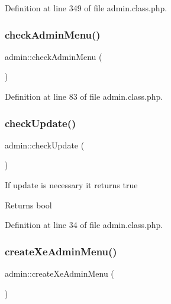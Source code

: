 Definition at line 349 of file admin.\+class.\+php.

\mbox{\label{classadmin_a622d33c49486a3cc46b5a008f46ac042}} 
\subsubsection{\texorpdfstring{check\+Admin\+Menu()}{checkAdminMenu()}}
{\footnotesize\ttfamily admin\+::check\+Admin\+Menu (\begin{DoxyParamCaption}{ }\end{DoxyParamCaption})}



Definition at line 83 of file admin.\+class.\+php.

\mbox{\label{classadmin_a62866d2839425085eefda928670d2638}} 
\subsubsection{\texorpdfstring{check\+Update()}{checkUpdate()}}
{\footnotesize\ttfamily admin\+::check\+Update (\begin{DoxyParamCaption}{ }\end{DoxyParamCaption})}

If update is necessary it returns true \begin{DoxyReturn}{Returns}
bool 
\end{DoxyReturn}


Definition at line 34 of file admin.\+class.\+php.

\mbox{\label{classadmin_a850ae671be9e3dc869230bd8daeb06ec}} 
\subsubsection{\texorpdfstring{create\+Xe\+Admin\+Menu()}{createXeAdminMenu()}}
{\footnotesize\ttfamily admin\+::create\+Xe\+Admin\+Menu (\begin{DoxyParamCaption}{ }\end{DoxyParamCaption})}

